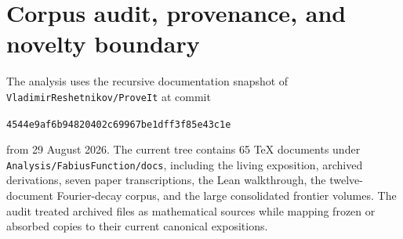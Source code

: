 \documentclass[11pt,oneside]{article}
\numberwithin{equation}{section}
\theoremstyle{definition}
\theoremstyle{remark}
\newcommand{\repo}{\nolinkurl{Analysis/FabiusFunction/docs}}
\begin{document}
\begin{abstract}
The factorization proves an exact transfer principle: every finite truncation
error inside a level is zero, and the infinite up-shift series converges,
diverges, or exhibits Runge oscillation precisely when the underlying
Lagrange series does.  Chebyshev--Lobatto levels therefore give
superalgebraic convergence for $u$, while the equispaced loop inherits the
repository's Runge instability.  Exact rational computations verify the
right-inverse identity through degree $8$; reduced-QR experiments show the
projector norm growing from $2.19$ at degree $2$ to $3.02\times10^3$ at
degree $12$ for equispaced nodes, versus $1.11\times10^2$ for Chebyshev
nodes.  A concrete first closed loop is
\[
 1-x^2=\sum_{k=-7}^{7}\left(\frac5{18}-\frac{k^2}{64}\right)
 u\!\left(x-\frac{k}{4}\right),\qquad -1\le x\le1.
\]
The report ends with conjectures on fixed-radius complexity, projector
obliquity, minimal-variation alias gauges, and Lambert-$W$/log-periodic
asymptotics of the equispaced boundary layer.
\end{abstract}

\clearpage
\tableofcontents
\clearpage

\section{Corpus audit, provenance, and novelty boundary}
\label{sec:corpus}

The analysis uses the recursive documentation snapshot of
\texttt{VladimirReshetnikov/ProveIt} at commit
\begin{center}
\nolinkurl{4544e9af6b94820402c69967be1dff3f85e43c1e}
\end{center}
from 29 August 2026.  The current tree contains 65 \TeX{} documents under
\repo, including the living exposition, archived derivations, seven paper
transcriptions, the Lean walkthrough, the twelve-document Fourier-decay
corpus, and the large consolidated frontier volumes.  The audit treated
archived files as mathematical sources while mapping frozen or absorbed
copies to their current canonical expositions.
\end{document}
